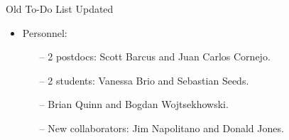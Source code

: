 \documentclass[10pt]{beamer}
\begin{document}
\begin{frame}{Old To-Do List Updated}
	\begin{itemize}
		\item \alert{Personnel:}
			\begin{itemize}
				\item[--] 2 postdocs: \alert{Scott Barcus} and \alert{Juan Carlos Cornejo}.
				\item[--] 2 students: \alert{Vanessa Brio} and \alert{Sebastian Seeds}.
				\item[--] \alert{Brian Quinn} and \alert{Bogdan Wojtsekhowski}.
				\item[--] New collaborators: \alert{Jim Napolitano} and \alert{Donald Jones}.
			\end{itemize}
	\end{itemize}

\end{frame}
\end{document}
